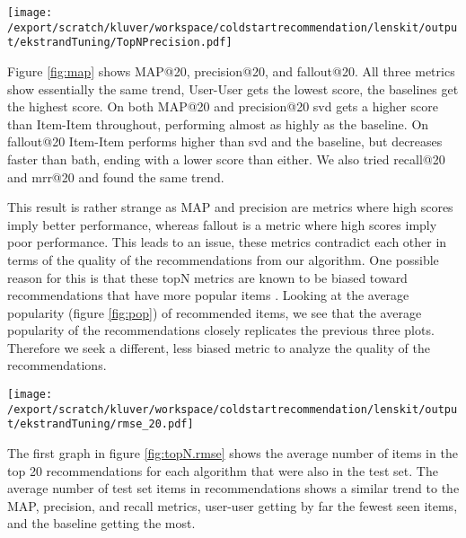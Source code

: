 \documentclass[letterpaper]{sig-alternate}
\begin{document}


\begin{figure*}[ht!]
  \centering
  \texttt{[image: /export/scratch/kluver/workspace/coldstartrecommendation/lenskit/output/ekstrandTuning/TopNPrecision.pdf]}
  \caption{TODO}
  \label{fig:map}
\end{figure*}


  Figure \ref{fig:map} shows MAP@20, precision@20, and fallout@20.
  All three metrics show essentially the same trend, User-User gets the lowest score, the baselines get the highest score.
  On both MAP@20 and precision@20 svd gets a higher score than Item-Item throughout, performing almost as highly as the baseline.
  On fallout@20 Item-Item performs higher than svd and the baseline, but decreases faster than bath, ending with a lower score than either. 
  We also tried recall@20 and mrr@20 and found the same trend.

  This result is rather strange as MAP and precision are metrics where high scores imply better performance, whereas fallout is a metric where high scores imply poor performance.
  This leads to an issue, these metrics contradict each other in terms of the quality of the recommendations from our algorithm.
  One possible reason for this is that these topN metrics are known to be biased toward recommendations that have more popular items \cite{bellogin}.
  Looking at the average popularity (figure \ref{fig:pop}) of recommended items, we see that the average popularity of the recommendations closely replicates the previous three plots.
  Therefore we seek a different, less biased metric to analyze the quality of the recommendations.



\begin{figure*}[ht!]
  \centering
  \texttt{[image: /export/scratch/kluver/workspace/coldstartrecommendation/lenskit/output/ekstrandTuning/rmse\_20.pdf]}
  \caption{TODO}
  \label{fig:topN.rmse}
\end{figure*}


  The first graph in figure \ref{fig:topN.rmse} shows the average number of items in the top 20 recommendations for each algorithm that were also in the test set.
  The average number of test set items in recommendations shows a similar trend to the MAP, precision, and recall metrics, user-user getting by far the fewest seen items, and the baseline getting the most.
\end{document}
